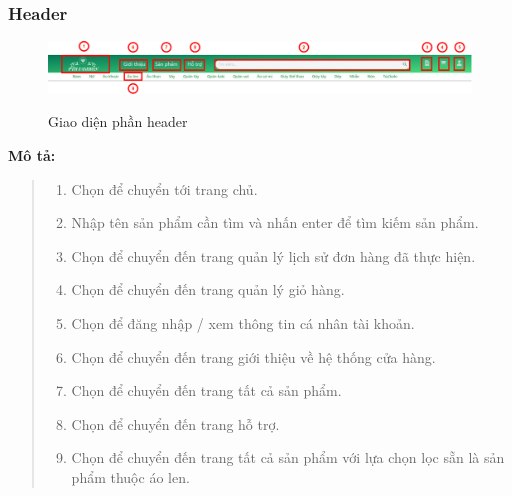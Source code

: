 \subsubsection{Header}
\begin{figure}[!htp]
    \centering
    \includegraphics[width=5in]{img/UI/new_customer/header.png}
    \label{6}
    \newline
    \caption{Giao diện phần header}
\end{figure}
\textbf{Mô tả:}
\begin{quote}
    \begin{enumerate}
        \item Chọn để chuyển tới trang chủ.
        \item Nhập tên sản phẩm cần tìm và nhấn enter để tìm kiếm sản phẩm.
        \item Chọn để chuyển đến trang quản lý lịch sử đơn hàng đã thực hiện.
        \item Chọn để chuyển đến trang quản lý giỏ hàng.
        \item Chọn để đăng nhập / xem thông tin cá nhân tài khoản.
        \item Chọn để chuyển đến trang giới thiệu về hệ thống cửa hàng.
        \item Chọn để chuyển đến trang tất cả sản phẩm.
        \item Chọn để chuyển đến trang hỗ trợ.
        \item Chọn để chuyển đến trang tất cả sản phẩm với lựa chọn lọc sẵn là sản phẩm thuộc áo len.
    \end{enumerate}
\end{quote}

